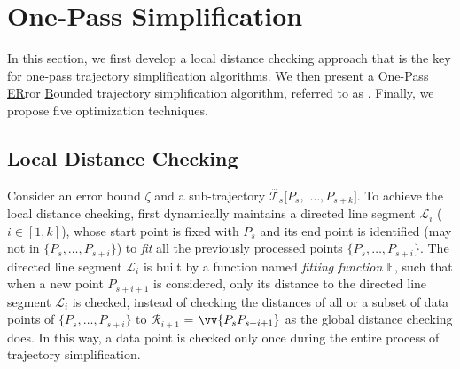 \section{One-Pass Simplification}
\label{sec-operb}


In this section, we first develop a local distance checking approach that is the key for one-pass trajectory simplification algorithms. We then present a \underline{O}ne-\underline{P}ass \underline{ER}ror \underline{B}ounded trajectory simplification algorithm, referred to as  \operb. Finally, we propose five optimization techniques.


\subsection{Local Distance Checking}
\label{subsec-fittingfunction}




Consider an error bound $\zeta$ and a sub-trajectory $\dddot{\mathcal{T}_s}[P_s,$ $\ldots, P_{s+k}]$. To achieve the local distance checking, \operb first dynamically maintains a directed line segment $\mathcal{L}_i$ ($i\in[1,k]$), whose start point is fixed with $P_s$ and its end point is identified (may not in $\{P_s, \ldots, P_{s+i}\}$) to {\em fit} all the previously processed points $\{P_s, \ldots, P_{s+i}\}$. The directed line segment $\mathcal{L}_i$ is built by a function named \emph{fitting function $\mathbb{F}$}, such that when a new point $P_{s+i+1}$ is considered, only its distance to the directed line segment $\mathcal{L}_i$ is checked, instead of checking the distances of all or a subset of data points of $\{P_{s}, \ldots, P_{s+i}\}$ to $\mathcal{R}_{i+1}$ = $\vv{P_sP_{s+i+1}}$  as the global distance checking does. In this way, a data point is checked only once during the entire process of trajectory simplification.


